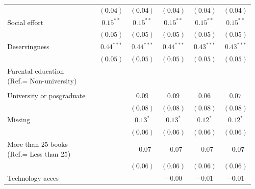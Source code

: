 \documentclass[
  12pt,
  letterpaper,
]{article}
\begin{document}
\begin{table}
{\begin{center}
{\begin{threeparttable}
\begin{tabular}{l c c c c c c}
                                                       &               & $(0.04)$      & $(0.04)$      & $(0.04)$      & $(0.04)$      & $(0.04)$      \\
Social effort                                          &               & $0.15^{**}$   & $0.15^{**}$   & $0.15^{**}$   & $0.15^{**}$   & $0.15^{**}$   \\
                                                       &               & $(0.05)$      & $(0.05)$      & $(0.05)$      & $(0.05)$      & $(0.05)$      \\
Deservingness                                          &               & $0.44^{***}$  & $0.44^{***}$  & $0.44^{***}$  & $0.43^{***}$  & $0.43^{***}$  \\
                                                       &               & $(0.05)$      & $(0.05)$      & $(0.05)$      & $(0.05)$      & $(0.05)$      \\
Parental education (Ref.= Non-university)              &               &               &               &               &               &               \\
                                                       &               &               &               &               &               &               \\
\quad University or posgraduate                        &               &               & $0.09$        & $0.09$        & $0.06$        & $0.07$        \\
                                                       &               &               & $(0.08)$      & $(0.08)$      & $(0.08)$      & $(0.08)$      \\
\quad Missing                                          &               &               & $0.13^{*}$    & $0.13^{*}$    & $0.12^{*}$    & $0.12^{*}$    \\
                                                       &               &               & $(0.06)$      & $(0.06)$      & $(0.06)$      & $(0.06)$      \\
More than 25 books (Ref.= Less than 25)                &               &               & $-0.07$       & $-0.07$       & $-0.07$       & $-0.07$       \\
                                                       &               &               & $(0.06)$      & $(0.06)$      & $(0.06)$      & $(0.06)$      \\
Technology acces                                       &               &               &               & $-0.00$       & $-0.01$       & $-0.01$       \\

\end{tabular}
\end{threeparttable}}
\end{center}}
\end{table}
\end{document}
